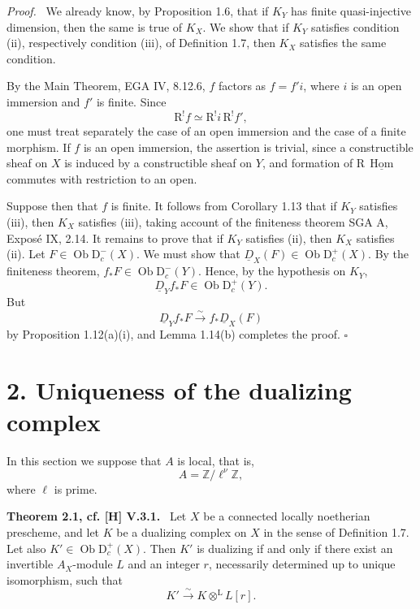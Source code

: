 \documentclass[12pt]{article}
\newcommand{\ZZ}{\mathbb Z}
\newcommand{\Hom}{\operatorname{Hom}}
\newcommand{\ob}{\operatorname{Ob}}
\newcommand{\D}{\mathrm D}
\newcommand{\R}{\mathrm R}
\newcommand{\qedtext}{\hfill$\square$}
\newenvironment{statement}[1]{\par\medskip\noindent\textbf{#1.}\ }{\par\medskip}
\newenvironment{prooftext}[1][Proof]{\par\noindent\emph{#1.}\ }{\par\medskip}
\begin{document}
\begin{prooftext}
We already know, by Proposition 1.6, that if $K_Y$ has finite quasi-injective dimension, then the same is true of $K_X$. We show that if $K_Y$ satisfies condition (ii), respectively condition (iii), of Definition 1.7, then $K_X$ satisfies the same condition.

By the Main Theorem, EGA IV, 8.12.6, $f$ factors as $f=f'i$, where $i$ is an open immersion and $f'$ is finite. Since
\[
   \R^!f\simeq\R^!i\,\R^!f',
\]
one must treat separately the case of an open immersion and the case of a finite morphism. If $f$ is an open immersion, the assertion is trivial, since a constructible sheaf on $X$ is induced by a constructible sheaf on $Y$, and formation of $\R\,\underline{\Hom}$ commutes with restriction to an open.

Suppose then that $f$ is finite. It follows from Corollary 1.13 that if $K_Y$ satisfies (iii), then $K_X$ satisfies (iii), taking account of the finiteness theorem SGA A, Exposé IX, 2.14. It remains to prove that if $K_Y$ satisfies (ii), then $K_X$ satisfies (ii). Let $F\in\ob\D_c^-(X)$. We must show that $\underline D_X(F)\in\ob\D_c^+(X)$. By the finiteness theorem, $f_*F\in\ob\D_c^-(Y)$. Hence, by the hypothesis on $K_Y$,
\[
   \underline D_Y f_*F\in\ob\D_c^+(Y).
\]
But
\[
   \underline D_Y f_*F\xrightarrow{\sim}f_*\underline D_X(F)
\]
by Proposition 1.12(a)(i), and Lemma 1.14(b) completes the proof. \qedtext
\end{prooftext}



\section*{2. Uniqueness of the dualizing complex}

In this section we suppose that $A$ is local, that is,
\[
   A=\ZZ/\ell^\nu\ZZ,
\]
where $\ell$ is prime.

\begin{statement}{Theorem 2.1, cf. [H] V.3.1}
Let $X$ be a connected locally noetherian prescheme, and let $K$ be a dualizing complex on $X$ in the sense of Definition 1.7. Let also $K'\in\ob\D_c^+(X)$. Then $K'$ is dualizing if and only if there exist an invertible $A_X$-module $L$ and an integer $r$, necessarily determined up to unique isomorphism, such that
\[
   K'\xrightarrow{\sim}K\otimes^{\mathrm L}L[r].
\]
\end{statement}
\end{document}
